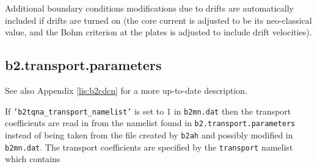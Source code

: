 \documentclass[a4paper,10pt]{report}
\begin{document}
Additional boundary conditions modifications due to
drifts are automatically included if drifts are turned on (the
core current is adjusted to be its neo-classical value, and the Bohm
criterion at the plates is adjusted to include drift velocities).

\subsection{b2.transport.parameters}
\label{lab:b2:transport:parameters}

See also Appendix \ref{lis:b2cdcn} for a more up-to-date description.

If {\tt 'b2tqna\_transport\_namelist'} is set to 1 in {\tt b2mn.dat}
then the transport coefficients are read in from the namelist found in
{\tt b2.transport.parameters} instead of being taken from the file
created by {\tt b2ah} and possibly modified in {\tt b2mn.dat}.
The transport coefficients are specified by the {\tt transport} namelist
which contains
\end{document}
